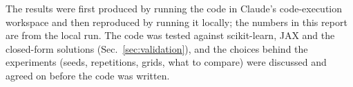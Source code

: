The results were first produced by running the code in Claude's code-execution workspace and then reproduced by running it locally; the numbers in this report are from the local run. The code was tested against scikit-learn, JAX and the closed-form solutions (Sec.~\ref{sec:validation}), and the choices behind the experiments (seeds, repetitions, grids, what to compare) were discussed and agreed on before the code was written.
